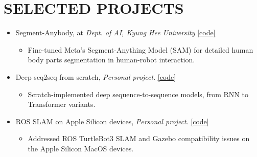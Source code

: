 \documentclass[a4paper,10pt]{extarticle}
\begin{document}
\section*{SELECTED PROJECTS}
\begin{itemize}
	\item Segment-Anybody, at \textit{Dept. of AI, Kyung Hee University} \href{https://github.com/leehyeonbeen/segment-anything-fine-tuning}{[code]}

	      {\footnotesize
		      \vspace*{-0.2cm}
		      \begin{itemize}
			      \item Fine-tuned Meta's Segment-Anything Model (SAM) for detailed human body parts segmentation in human-robot interaction.
		      \end{itemize}
		      \vspace*{-0.2cm}
	      }

	\item Deep seq2seq from scratch, \textit{Personal project}. \href{https://github.com/leehyeonbeen/TimeSeriesSeq2Seq}{[code]}

	      {\footnotesize
		      \vspace*{-0.2cm}
		      \begin{itemize}
			      \item Scratch-implemented deep sequence-to-sequence models, from RNN to Transformer variants.
		      \end{itemize}
		      \vspace*{-0.2cm}
	      }

	\item ROS SLAM on Apple Silicon devices, \textit{Personal project}. \href{https://github.com/leehyeonbeen/ROS-SLAM-AppleSilicon}{[code]}

	      {\footnotesize
		      \vspace*{-0.2cm}
		      \begin{itemize}
			      \item Addressed ROS TurtleBot3 SLAM and Gazebo compatibility issues on the Apple Silicon MacOS devices.
		      \end{itemize}
		      \vspace*{-0.2cm}
	      }






\end{itemize}
\end{document}
